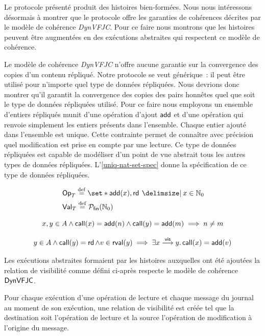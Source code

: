 Le protocole présenté produit des histoires bien-formées.
Nous nous intéressons désormais à montrer que le protocole offre les garanties de cohérences décrites par le modèle de cohérence \emph{DynVFJC}.
Pour ce faire nous montrons que les histoires peuvent être augmentées en des exécutions abstraites qui respectent ce modèle de cohérence.

Le modèle de cohérence \emph{DynVFJC} n'offre aucune garantie sur la convergence des copies d'un contenu répliqué.
Notre protocole se veut générique~: il peut être utilisé pour n'importe quel type de données répliquées.
Nous devrions donc montrer qu'il garantit la convergence des copies des pairs honnêtes quel que soit le type de données répliquées utilisé.
Pour ce faire nous employons un ensemble d'entiers répliqués munit d'une opération d'ajout $\operatorname{\mathsf{add}}$ et d'une opération qui renvoie simplement les entiers présents dans l'ensemble.
Chaque entier ajouté dans l'ensemble est unique.
Cette contrainte permet de connaître avec précision quel modification est prise en compte par une lecture.
Ce type de données répliquées est capable de modéliser d'un point de vue abstrait tous les autres types de données répliquées.
L'\autoref{uniq-nat-set-spec} donne la spécification de ce type de données répliquées.

\begin{align}
    &\trm{Op}_T \defeq \set*{\trm{add}(x), \trm{rd} \given x \in \mathbb{N}_0}\\
    &\trm{Val}_T \defeq \powerfset{\mathbb{N}_0}
\end{align}

\begin{equation}\label{eq:uniq-set-spec-1}
    x, y \in A \land \operatorname{\mathsf{call}}(x) = \operatorname{\mathsf{add}}(n) \land \operatorname{\mathsf{call}}(y) = \operatorname{\mathsf{add}}(m) \implies n \neq m
\end{equation}

\begin{equation}\label{eq:uniq-set-spec-2}
    y \in A \land \operatorname{\mathsf{call}}(y) = \operatorname{\mathsf{rd}} \land v \in \operatorname{\mathsf{rval}}(y) \implies \exists x \overset{\mathsf{vis}}{\longrightarrow} y \ldotp \operatorname{\mathsf{call}}(x) = \operatorname{\mathsf{add}}(v)
\end{equation}

Les exécutions abstraites formaient par les histoires auxquelles ont été ajoutées la relation de visibilité comme défini ci-après respecte le modèle de cohérence $\operatorname{\mathsf{DynVFJC}}$.

Pour chaque exécution d'une opération de lecture et chaque message du journal au moment de son exécution, une relation de visibilité est créée tel que la destination soit l'opération de lecture et la source l'opération de modification à l'origine du message.

